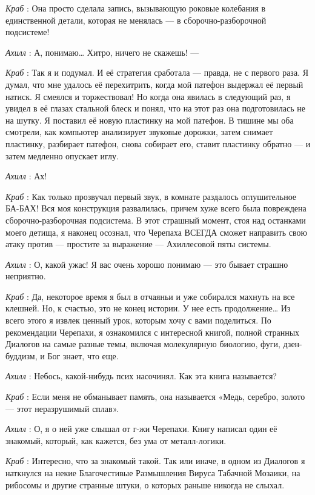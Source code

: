 \documentclass[../main.tex]{subfiles}
\begin{document}
\begin{dialogue}
\emph{Краб} : Она просто сделала запись, вызывающую роковые колебания в единственной детали, которая не менялась --- в сборочно-разборочной подсистеме!

\emph{Ахилл} : А, понимаю\ldots{} Хитро, ничего не скажешь! ---

\emph{Краб} : Так я и подумал. И её стратегия сработала --- правда, не с первого раза. Я думал, что мне удалось её перехитрить, когда мой патефон выдержал её первый натиск. Я смеялся и торжествовал! Но когда она явилась в следующий раз, я увидел в её глазах стальной блеск и понял, что на этот раз она подготовилась не на шутку. Я поставил её новую пластинку на мой патефон. В тишине мы оба смотрели, как компьютер анализирует звуковые дорожки, затем снимает пластинку, разбирает патефон, снова собирает его, ставит пластинку обратно --- и затем медленно опускает иглу.

\emph{Ахилл} : Ах!

\emph{Краб} : Как только прозвучал первый звук, в комнате раздалось оглушительное БА-БАХ! Вся моя конструкция развалилась, причем хуже всего была повреждена сборочно-разборочная подсистема. В этот страшный момент, стоя над останками моего детища, я наконец осознал, что Черепаха ВСЕГДА сможет направить свою атаку против --- простите за выражение --- Ахиллесовой пяты системы.

\emph{Ахилл} : О, какой ужас! Я вас очень хорошо понимаю --- это бывает страшно неприятно.

\emph{Краб} : Да, некоторое время я был в отчаяньи и уже собирался махнуть на все клешней. Но, к счастью, это не конец истории. У нее есть продолжение\ldots{} Из всего этого я извлек ценный урок, которым хочу с вами поделиться. По рекомендации Черепахи, я ознакомился с интересной книгой, полной странных Диалогов на самые разные темы, включая молекулярную биологию, фуги, дзен-буддизм, и Бог знает, что еще.

\emph{Ахилл} : Небось, какой-нибудь псих насочинял. Как эта книга называется?

\emph{Краб} : Если меня не обманывает память, она называется «Медь, серебро, золото --- этот неразрушимый сплав».

\emph{Ахилл} : О, я о ней уже слышал от г-жи Черепахи. Книгу написал один её знакомый, который, как кажется, без ума от металл-логики.

\emph{Краб} : Интересно, что за знакомый такой. Так или иначе, в одном из Диалогов я наткнулся на некие Благочестивые Размышления Вируса Табачной Мозаики, на рибосомы и другие странные штуки, о которых раньше никогда не слыхал.


\end{dialogue}
\end{document}
